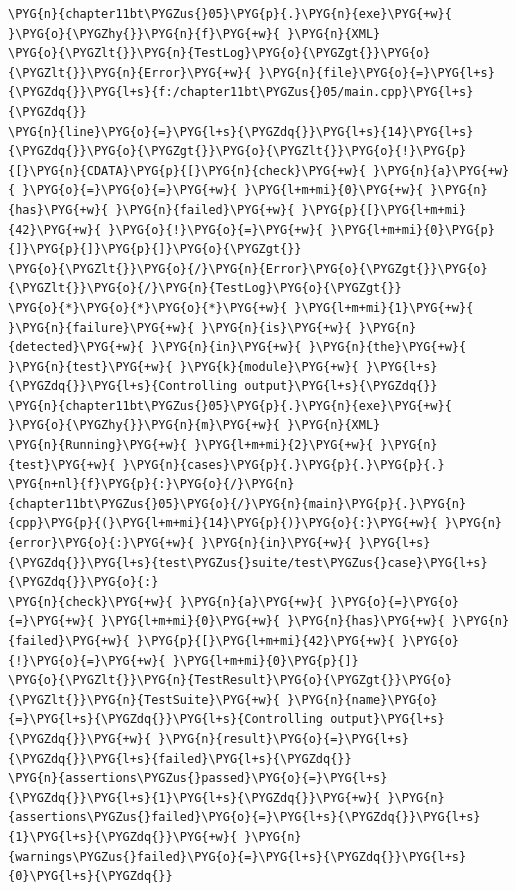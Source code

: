 \begin{codeblockbg}
\begin{Verbatim}[commandchars=\\\{\},breaklines=true,breakanywhere=true,fontsize=\codefont,xleftmargin=17bp]
\PYG{n}{chapter11bt\PYGZus{}05}\PYG{p}{.}\PYG{n}{exe}\PYG{+w}{ }\PYG{o}{\PYGZhy{}}\PYG{n}{f}\PYG{+w}{ }\PYG{n}{XML}
\PYG{o}{\PYGZlt{}}\PYG{n}{TestLog}\PYG{o}{\PYGZgt{}}\PYG{o}{\PYGZlt{}}\PYG{n}{Error}\PYG{+w}{ }\PYG{n}{file}\PYG{o}{=}\PYG{l+s}{\PYGZdq{}}\PYG{l+s}{f:/chapter11bt\PYGZus{}05/main.cpp}\PYG{l+s}{\PYGZdq{}}
\PYG{n}{line}\PYG{o}{=}\PYG{l+s}{\PYGZdq{}}\PYG{l+s}{14}\PYG{l+s}{\PYGZdq{}}\PYG{o}{\PYGZgt{}}\PYG{o}{\PYGZlt{}}\PYG{o}{!}\PYG{p}{[}\PYG{n}{CDATA}\PYG{p}{[}\PYG{n}{check}\PYG{+w}{ }\PYG{n}{a}\PYG{+w}{ }\PYG{o}{=}\PYG{o}{=}\PYG{+w}{ }\PYG{l+m+mi}{0}\PYG{+w}{ }\PYG{n}{has}\PYG{+w}{ }\PYG{n}{failed}\PYG{+w}{ }\PYG{p}{[}\PYG{l+m+mi}{42}\PYG{+w}{ }\PYG{o}{!}\PYG{o}{=}\PYG{+w}{ }\PYG{l+m+mi}{0}\PYG{p}{]}\PYG{p}{]}\PYG{p}{]}\PYG{o}{\PYGZgt{}}
\PYG{o}{\PYGZlt{}}\PYG{o}{/}\PYG{n}{Error}\PYG{o}{\PYGZgt{}}\PYG{o}{\PYGZlt{}}\PYG{o}{/}\PYG{n}{TestLog}\PYG{o}{\PYGZgt{}}
\PYG{o}{*}\PYG{o}{*}\PYG{o}{*}\PYG{+w}{ }\PYG{l+m+mi}{1}\PYG{+w}{ }\PYG{n}{failure}\PYG{+w}{ }\PYG{n}{is}\PYG{+w}{ }\PYG{n}{detected}\PYG{+w}{ }\PYG{n}{in}\PYG{+w}{ }\PYG{n}{the}\PYG{+w}{ }\PYG{n}{test}\PYG{+w}{ }\PYG{k}{module}\PYG{+w}{ }\PYG{l+s}{\PYGZdq{}}\PYG{l+s}{Controlling output}\PYG{l+s}{\PYGZdq{}}
\PYG{n}{chapter11bt\PYGZus{}05}\PYG{p}{.}\PYG{n}{exe}\PYG{+w}{ }\PYG{o}{\PYGZhy{}}\PYG{n}{m}\PYG{+w}{ }\PYG{n}{XML}
\PYG{n}{Running}\PYG{+w}{ }\PYG{l+m+mi}{2}\PYG{+w}{ }\PYG{n}{test}\PYG{+w}{ }\PYG{n}{cases}\PYG{p}{.}\PYG{p}{.}\PYG{p}{.}
\PYG{n+nl}{f}\PYG{p}{:}\PYG{o}{/}\PYG{n}{chapter11bt\PYGZus{}05}\PYG{o}{/}\PYG{n}{main}\PYG{p}{.}\PYG{n}{cpp}\PYG{p}{(}\PYG{l+m+mi}{14}\PYG{p}{)}\PYG{o}{:}\PYG{+w}{ }\PYG{n}{error}\PYG{o}{:}\PYG{+w}{ }\PYG{n}{in}\PYG{+w}{ }\PYG{l+s}{\PYGZdq{}}\PYG{l+s}{test\PYGZus{}suite/test\PYGZus{}case}\PYG{l+s}{\PYGZdq{}}\PYG{o}{:}
\PYG{n}{check}\PYG{+w}{ }\PYG{n}{a}\PYG{+w}{ }\PYG{o}{=}\PYG{o}{=}\PYG{+w}{ }\PYG{l+m+mi}{0}\PYG{+w}{ }\PYG{n}{has}\PYG{+w}{ }\PYG{n}{failed}\PYG{+w}{ }\PYG{p}{[}\PYG{l+m+mi}{42}\PYG{+w}{ }\PYG{o}{!}\PYG{o}{=}\PYG{+w}{ }\PYG{l+m+mi}{0}\PYG{p}{]}
\PYG{o}{\PYGZlt{}}\PYG{n}{TestResult}\PYG{o}{\PYGZgt{}}\PYG{o}{\PYGZlt{}}\PYG{n}{TestSuite}\PYG{+w}{ }\PYG{n}{name}\PYG{o}{=}\PYG{l+s}{\PYGZdq{}}\PYG{l+s}{Controlling output}\PYG{l+s}{\PYGZdq{}}\PYG{+w}{ }\PYG{n}{result}\PYG{o}{=}\PYG{l+s}{\PYGZdq{}}\PYG{l+s}{failed}\PYG{l+s}{\PYGZdq{}}
\PYG{n}{assertions\PYGZus{}passed}\PYG{o}{=}\PYG{l+s}{\PYGZdq{}}\PYG{l+s}{1}\PYG{l+s}{\PYGZdq{}}\PYG{+w}{ }\PYG{n}{assertions\PYGZus{}failed}\PYG{o}{=}\PYG{l+s}{\PYGZdq{}}\PYG{l+s}{1}\PYG{l+s}{\PYGZdq{}}\PYG{+w}{ }\PYG{n}{warnings\PYGZus{}failed}\PYG{o}{=}\PYG{l+s}{\PYGZdq{}}\PYG{l+s}{0}\PYG{l+s}{\PYGZdq{}}

\end{Verbatim}
\end{codeblockbg}
